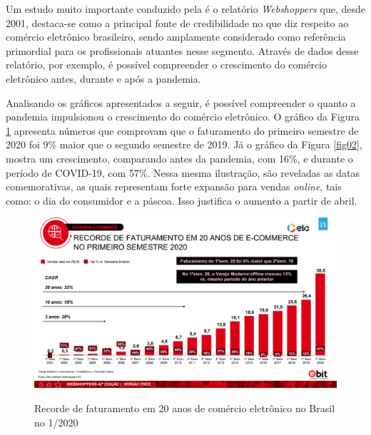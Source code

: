 Um estudo muito importante conduzido pela  é o relatório \textit{Webshoppers} que, desde 2001, destaca-se como a principal fonte de credibilidade no que diz respeito ao comércio eletrônico brasileiro, sendo amplamente considerado como referência primordial para os profissionais atuantes nesse segmento. Através de dados desse relatório, por exemplo, é possível compreender o crescimento do comércio eletrônico antes, durante e após a pandemia.

Analisando os gráficos apresentados a seguir, é possível compreender o quanto a pandemia impulsionou o crescimento do comércio eletrônico. O gráfico da Figura \ref{fig01} apresenta números que comprovam que o faturamento do primeiro semestre de 2020 foi 9\% maior que o segundo semestre de 2019. Já o gráfico da Figura \ref{fig02}, mostra um crescimento, comparando antes da pandemia, com 16\%, e durante o período de COVID-19, com 57\%. Nessa mesma ilustração, são reveladas as datas comemorativas, as quais representam forte expansão para vendas \textit{online}, tais como: o dia do consumidor e a páscoa. Isso justifica o aumento a partir de abril.

\begin{figure}[h]
    \centering
    \caption{Recorde de faturamento em 20 anos de comércio eletrônico no Brasil no 1/2020}
    \includegraphics[keepaspectratio=true,scale=0.3]{figuras/edicao42.png}
    \label{fig01}
\end{figure}

